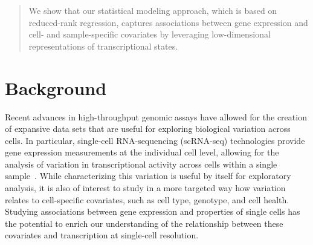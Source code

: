 \documentclass{bmcart}
\begin{document}
\begin{frontmatter}
\begin{abstractbox}
\begin{abstract}
We show that our statistical modeling approach, which is based on reduced-rank regression, captures associations between gene expression and cell- and sample-specific covariates by leveraging low-dimensional representations of transcriptional states.

\end{abstract}


\begin{keyword}
\end{keyword}
\end{abstractbox}


\end{frontmatter}


\section*{Background}
Recent advances in high-throughput genomic assays have allowed for the creation of expansive data sets that are useful for exploring biological variation across cells. In particular, single-cell RNA-sequencing (scRNA-seq) technologies provide gene expression measurements at the individual cell level, allowing for the analysis of variation in transcriptional activity across cells within a single sample~\citep{tang2009mrna,sasagawa2013quartz,jaitin2014massively,zeisel2015cell}. While characterizing this variation is useful by itself for exploratory analysis, it is also of interest to study in a more targeted way how variation relates to cell-specific covariates, such as cell type, genotype, and cell health. Studying associations between gene expression and properties of single cells has the potential to enrich our understanding of the relationship between these covariates and transcription at single-cell resolution. 
\end{document}
